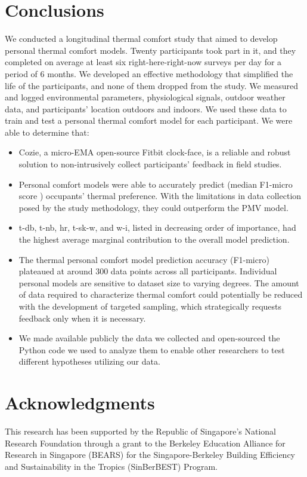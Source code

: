 \section{Conclusions}\label{sec:conclusions}
We conducted a longitudinal thermal comfort study that aimed to develop personal thermal comfort models.
Twenty participants took part in it, and they completed on average at least six right-here-right-now surveys per day for a period of 6 months.
We developed an effective methodology that simplified the life of the participants, and none of them dropped from the study.
We measured and logged environmental parameters, physiological signals, outdoor weather data, and participants' location outdoors and indoors.
We used these data to train and test a personal thermal comfort model for each participant.
We were able to determine that:

\begin{itemize}
    \item Cozie, a micro-EMA open-source Fitbit clock-face, is a reliable and robust solution to non-intrusively collect participants' feedback in field studies.
    \item Personal comfort models were able to accurately predict (median F1-micro score ) occupants' thermal preference.
    With the limitations in data collection posed by the study methodology, they could outperform the PMV model.
    \item \Acf{t-db}, \acf{t-nb}, \acf{hr}, \acf{t-sk-w}, and \acf{w-i}, listed in decreasing order of importance, had the highest average marginal contribution to the overall model prediction.
    \item The thermal personal comfort model prediction accuracy (F1-micro) plateaued at around 300 data points across all participants.
    Individual personal models are sensitive to dataset size to varying degrees.
    The amount of data required to characterize thermal comfort could potentially be reduced with the development of targeted sampling, which strategically requests feedback only when it is necessary.
    \item We made available publicly the data we collected and open-sourced the Python code we used to analyze them to enable other researchers to test different hypotheses utilizing our data.
\end{itemize}

\section*{Acknowledgments}\label{sec:acknowledgments}
This research has been supported by the Republic of Singapore's National Research Foundation through a grant to the Berkeley Education Alliance for Research in Singapore (BEARS) for the Singapore-Berkeley Building Efficiency and Sustainability in the Tropics (SinBerBEST) Program.